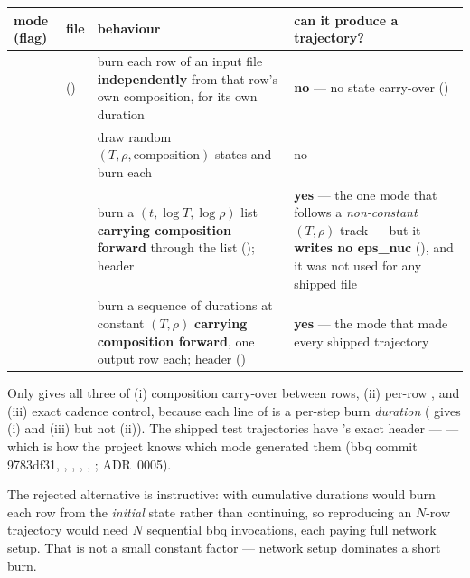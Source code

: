 \begingroup\small
\begin{center}
\begin{tabularx}{\textwidth}{@{}L{2.3cm} L{2.9cm} Y L{4.0cm}@{}}
\toprule
\textbf{mode (flag)} & \textbf{file} & \textbf{behaviour} &
  \textbf{can it produce a trajectory?} \\
\midrule
{} & 
  () &
  burn each row of an input file \textbf{independently} from that row's own
  composition, for its own duration &
  \textbf{no} --- no state carry-over () \\
 &  &
  draw random $(T, \rho, \text{composition})$ states and burn each & no \\
 &  &
  burn a $(t, \log T, \log\rho)$ list \textbf{carrying composition forward}
  through the list (); header
   &
  \textbf{yes} --- the one mode that follows a \emph{non-constant} $(T, \rho)$
  track --- but it \textbf{writes no eps\_nuc} (), and it
  was not used for any shipped file \\
 &  &
  burn a sequence of durations at constant $(T, \rho)$ \textbf{carrying
  composition forward}, one output row each; header
   () &
  \textbf{yes} --- the mode that made every shipped trajectory \\
\bottomrule
\end{tabularx}
\end{center}
\endgroup

Only  gives all three of (i) composition carry-over
between rows, (ii) per-row , and (iii) exact cadence control,
because each line of  is a per-step burn \emph{duration}
( gives (i) and (iii) but not (ii)). The shipped test
trajectories have 's exact header ---
 --- which is how the project knows which
mode generated them (bbq commit 9783df31, ,
, ,
, ;
ADR~0005).

The rejected alternative is instructive:  with cumulative
durations would burn each row from the \emph{initial} state rather than
continuing, so reproducing an $N$-row trajectory would need $N$ sequential bbq
invocations, each paying full network setup. That is not a small constant
factor --- network setup dominates a short burn.

